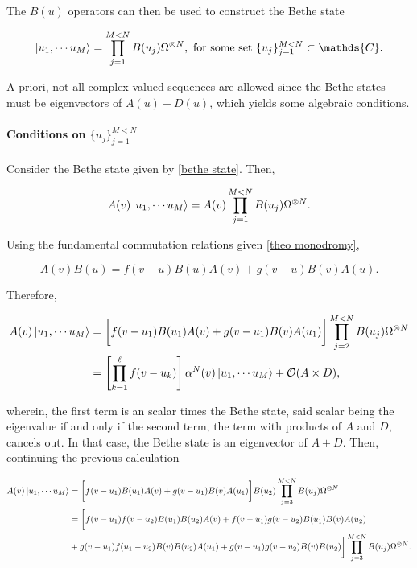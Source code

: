 \documentclass{homework}
\begin{document}
The $B(u)$ operators can then be used to construct the Bethe state

\begin{equation}
    \ket{u_1, \cdots u_M} = \prod_{j=1}^{M < N} B(u_j) \Omega^{\otimes N}, \textnormal{ for some set } \{u_j\}_{j=1}^{M < N} \subset \mathds{C}.
    \label{bethe state}
\end{equation}

A priori, not all complex-valued sequences are allowed since the Bethe states must be eigenvectors of $A(u) + D(u)$, which yields some algebraic conditions. \\

\paragraph{\textbf{Conditions on } $\{u_j\}_{j=1}^{M < N}$}

Consider the Bethe state given by \cref{bethe state}. Then, 

\begin{equation*}
    A(v) \ket{u_1, \cdots u_M} = A(v) \prod_{j=1}^{M < N} B(u_j) \Omega^{\otimes N}.
\end{equation*}

Using the fundamental commutation relations given \cref{theo monodromy},

$$
    A(v) B(u) = f(v-u) B(u) A(v) + g(v-u) B(v) A(u).
$$

Therefore,

\begin{equation}
    \begin{split}
        A(v) \ket{u_1, \cdots u_M} &= \bigg[f(v-u_1) B(u_1) A(v) + g(v-u_1) B(v) A(u_1)\bigg] \prod_{j=2}^{M < N} B(u_j) \Omega^{\otimes N} \\
        &= \left[\prod_{k=1}^{\ell} f(v-u_k)\right] \alpha^N(v) \ket{u_1, \cdots u_M} + \mathcal{O}({A \times D}),
    \end{split}
\end{equation}

wherein, the first term is an scalar times the Bethe state, said scalar being the eigenvalue if and only if the second term, the term with products of $A$ and $D$, cancels out. In that case, the Bethe state is an eigenvector of $A + D$. Then, continuing the previous calculation 

\begin{equation}
    \begin{split}
         A(v) \ket{u_1, \cdots u_M} &=  \bigg[f(v-u_1) B(u_1) A(v) + g(v-u_1) B(v) A(u_1)\bigg] B(u_2) \prod_{j=3}^{M < N} B(u_j) \Omega^{\otimes N} \\
         &= \bigg[f(v-u_1)f(v-u_2) B(u_1) B(u_2) A(v) + f(v-u_1)g(v-u_2) B(u_1) B(v) A(u_2) \\
         & + g(v-u_1)f(u_1-u_2) B(v) B(u_2) A(u_1) + g(v-u_1)g(v-u_2) B(v) B(u_2)
         \bigg] \prod_{j=3}^{M < N} B(u_j) \Omega^{\otimes N}. 
    \end{split}
\end{equation}
\end{document}
